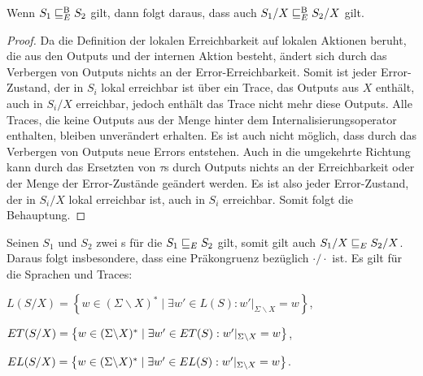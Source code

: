 \begin{prop}
\label{propErBaIn}
  Wenn $S_1\sqsubseteq _E^\mathrm{B} S_2$ gilt, dann folgt daraus, dass auch $S_1/X\sqsubseteq _E^\mathrm{B} S_2/X$
  gilt.
\end{prop}

\begin{proof}
  Da die Definition der lokalen Erreichbarkeit auf lokalen Aktionen beruht, die
  aus den Outputs und der internen Aktion besteht, ändert sich durch das
  Verbergen von Outputs nichts an der Error-Erreichbarkeit. Somit ist jeder
  Error-Zustand, der in $S_i$ lokal erreichbar ist über ein Trace, das Outputs aus $X$
  enthält, auch in $S_i/X$ erreichbar, jedoch enthält das Trace
  nicht mehr diese Outputs. Alle Traces, die keine Outputs aus der Menge hinter
  dem Internalisierungsoperator enthalten, bleiben unverändert erhalten. Es ist
  auch nicht möglich, dass durch das Verbergen von Outputs neue Errors
  entstehen. Auch in die umgekehrte Richtung kann durch das Ersetzten von
  $\tau$s durch Outputs nichts an der Erreichbarkeit oder der Menge der
  Error-Zustände geändert werden. Es ist also jeder Error-Zustand, der in $S_i/X$ lokal erreichbar
  ist, auch in $S_i$ erreichbar. Somit folgt die Behauptung.
\end{proof}

\begin{satz}
\label{satzPraeInternalisierung}
  Seinen $S_1$ und $S_2$ zwei \EIO{}s für die $S_1\sqsubseteq _E S_2$ gilt, somit gilt
  auch $S_1/X\sqsubseteq _E S_2/X$. Daraus folgt insbesondere, dass \ERel{} eine
  Präkongruenz bezüglich $\cdot /\cdot$ ist.
  Es gilt für die Sprachen und Traces:
  \begin{compactenum}[(i)]
  \item $L(S/X) = \left\{w\in (\Sigma\backslash X){}^*\mid \exists w'\in L(S):
      w'|_{\Sigma\backslash X} = w\right\}$,
    \item $ET{}(S/X) = \left\{w\in (\Sigma\backslash X){}^*\mid \exists
      w'\in ET{}(S): w'|_{\Sigma\backslash X} = w\right\}$,
    \item $EL{}(S/X) = \left\{w\in (\Sigma\backslash X){}^*\mid \exists w'\in
      EL(S): w'|_{\Sigma\backslash X} = w\right\}$.
  \end{compactenum}
\end{satz}

